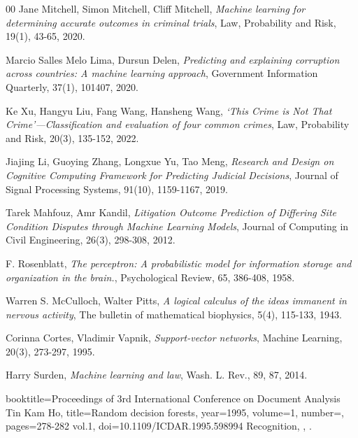 \documentclass[fleqn,10pt]{wlscirep}
\begin{document}
%
\begin{thebibliography}{00}
  Jane Mitchell, Simon Mitchell, Cliff Mitchell,
  \textit{{Machine learning for determining accurate outcomes in criminal trials}},
  Law, Probability and Risk,
  19(1),
  43-65,
  2020.


  Marcio Salles Melo Lima, Dursun Delen,
  \textit{Predicting and explaining corruption across countries: A machine learning approach},
  Government Information Quarterly,
  37(1),
  101407,
  2020.


  Ke Xu, Hangyu Liu, Fang Wang, Hansheng Wang,
  \textit{{‘This Crime is Not That Crime’—Classification and evaluation of four common crimes}},
  Law, Probability and Risk,
  20(3),
  135-152,
  2022.


  Jiajing Li, Guoying Zhang, Longxue Yu, Tao Meng,
  \textit{Research and Design on Cognitive Computing Framework for Predicting Judicial Decisions},
  Journal of Signal Processing Systems,
  91(10),
  1159-1167,
  2019.


  Tarek Mahfouz, Amr Kandil,
  \textit{Litigation Outcome Prediction of Differing Site Condition Disputes through Machine Learning Models},
  Journal of Computing in Civil Engineering,
  26(3),
  298-308,
  2012.


  F. Rosenblatt,
  \textit{The perceptron: A probabilistic model for information storage and organization in the brain.},
  Psychological Review,
  65,
  386-408,
  1958.


  Warren S. McCulloch, Walter Pitts,
  \textit{A logical calculus of the ideas immanent in nervous activity},
  The bulletin of mathematical biophysics,
  5(4),
  115-133,
  1943.


  Corinna Cortes, Vladimir Vapnik,
  \textit{Support-vector networks},
  Machine Learning,
  20(3),
  273-297,
  1995.


  Harry Surden,
  \textit{Machine learning and law},
  Wash. L. Rev.,
  89,
  87,
  2014.


  booktitle={Proceedings of 3rd International Conference on Document Analysis Tin Kam Ho}, title={Random decision forests},   year={1995},  volume={1},  number={},  pages={278-282 vol.1},  doi={10.1109/ICDAR.1995.598994} Recognition,
  \textit{},
  .



\end{thebibliography}
\end{document}
